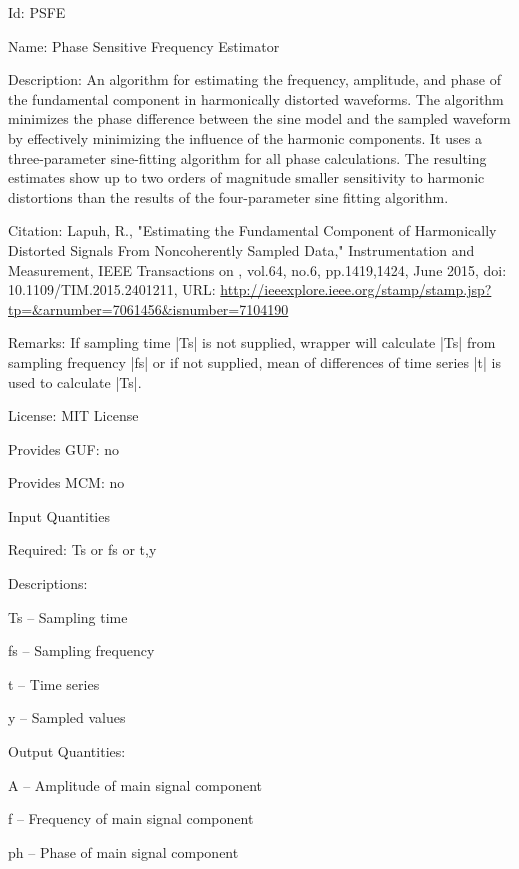 \begin{tightdesc}
\item [Id:] PSFE
\item [Name:] Phase Sensitive Frequency Estimator
\item [Description:] An algorithm for estimating the frequency, amplitude, and phase of the fundamental component in harmonically distorted waveforms. The algorithm minimizes the phase difference between the sine model and the sampled waveform by effectively minimizing the influence of the harmonic components. It uses a three-parameter sine-fitting algorithm for all phase calculations. The resulting estimates show up to two orders of magnitude smaller sensitivity to harmonic distortions than the results of the four-parameter sine fitting algorithm.
\item [Citation:] Lapuh, R., "Estimating the Fundamental Component of Harmonically Distorted Signals From Noncoherently Sampled Data," Instrumentation and Measurement, IEEE Transactions on , vol.64, no.6, pp.1419,1424, June 2015, doi: 10.1109/TIM.2015.2401211, URL: \url{http://ieeexplore.ieee.org/stamp/stamp.jsp?tp=\&arnumber=7061456\&isnumber=7104190}
\item [Remarks:] If sampling time |Ts| is not supplied, wrapper will calculate |Ts| from sampling frequency |fs| or if not supplied, mean of differences of time series |t| is used to calculate |Ts|.
\item [License:] MIT License
\item [Provides GUF:] no
\item [Provides MCM:] no
\item [Input Quantities] \rule{0em}{0em}
    \begin{tightdesc}
    \item [Required:] 
        \textsf{Ts} or \textsf{fs} or \textsf{t},\enspace \textsf{y}
    \item [Descriptions:] \rule{0em}{0em}
        \begin{tightdesc}
            \item[\textsf{Ts}] -- Sampling time
            \item[\textsf{fs}] -- Sampling frequency
            \item[\textsf{t}] -- Time series
            \item[\textsf{y}] -- Sampled values
        \end{tightdesc}
    \end{tightdesc}
\item [Output Quantities:] \rule{0em}{0em}
    \begin{tightdesc}
        \item[\textsf{A}] -- Amplitude of main signal component
        \item[\textsf{f}] -- Frequency of main signal component
        \item[\textsf{ph}] -- Phase of main signal component
    \end{tightdesc}
\end{tightdesc}
